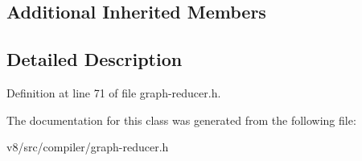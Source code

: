 \subsection*{Additional Inherited Members}


\subsection{Detailed Description}


Definition at line 71 of file graph-\/reducer.\+h.



The documentation for this class was generated from the following file\+:\begin{DoxyCompactItemize}
\item 
v8/src/compiler/graph-\/reducer.\+h\end{DoxyCompactItemize}
